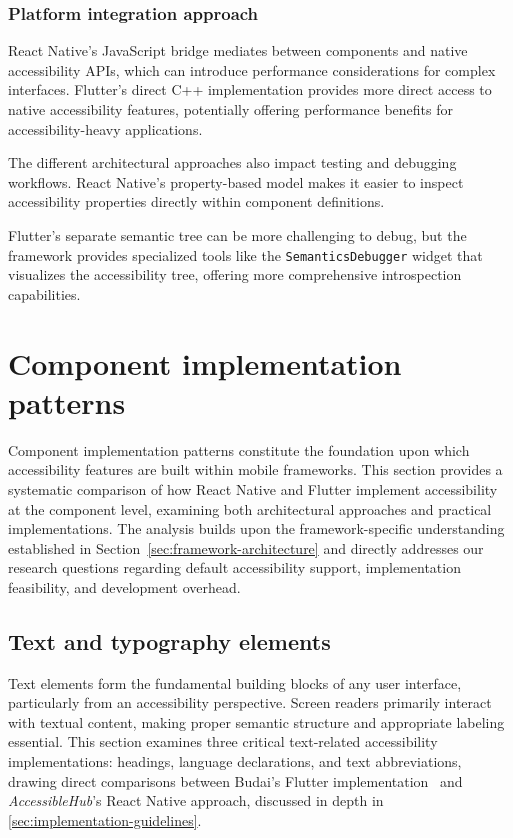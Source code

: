 \subsubsection{Platform integration approach}
React Native's JavaScript bridge mediates between components and native accessibility APIs, which can introduce performance considerations for complex interfaces. Flutter's direct C++ implementation provides more direct access to native accessibility features, potentially offering performance benefits for accessibility-heavy applications.

The different architectural approaches also impact testing and debugging workflows. React Native's property-based model makes it easier to inspect accessibility properties directly within component definitions.

Flutter's separate semantic tree can be more challenging to debug, but the framework provides specialized tools like the \texttt{SemanticsDebugger} widget that visualizes the accessibility tree, offering more comprehensive introspection capabilities.

\section{Component implementation patterns}
\label{sec:component-implementation}

Component implementation patterns constitute the foundation upon which accessibility features are built within mobile frameworks. This section provides a systematic comparison of how React Native and Flutter implement accessibility at the component level, examining both architectural approaches and practical implementations. The analysis builds upon the framework-specific understanding established in Section~\ref{sec:framework-architecture} and directly addresses our research questions regarding default accessibility support, implementation feasibility, and development overhead.

\subsection{Text and typography elements}
\label{subsec:text-typography}

Text elements form the fundamental building blocks of any user interface, particularly from an accessibility perspective. Screen readers primarily interact with textual content, making proper semantic structure and appropriate labeling essential. This section examines three critical text-related accessibility implementations: headings, language declarations, and text abbreviations, drawing direct comparisons between Budai's Flutter implementation~\cite{budai2024mobile} and \textit{AccessibleHub}'s React Native approach, discussed in depth in \ref{sec:implementation-guidelines}.


